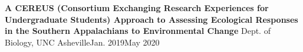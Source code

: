 {\entrybigwrap
    {{\textbf{A CEREUS (Consortium Exchanging Research Experiences for Undergraduate Students) Approach to Assessing Ecological Responses in the Southern Appalachians to Environmental Change}}}
    {{Dept. of Biology, UNC Asheville}{\hfill Jan. 2019\textendash May 2020}}
}

